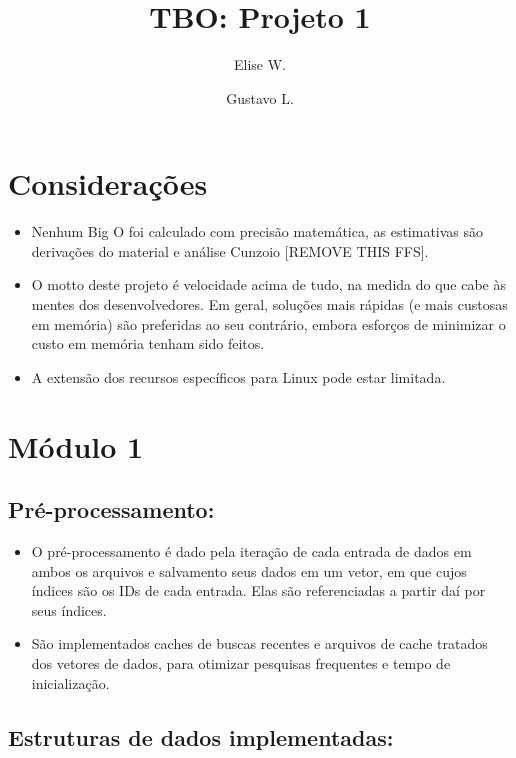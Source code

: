 \documentclass{article}
\author{Elise W.\and Gustavo L.}
\date{}
\title{TBO: Projeto 1}
\begin{document}
\maketitle

\section*{Considerações}

	\begin{itemize}

		\item Nenhum Big O foi calculado com precisão matemática, as estimativas são derivações do material e análise Cunzoio [REMOVE THIS FFS].

		\item O motto deste projeto é velocidade acima de tudo, na medida do que cabe às mentes dos desenvolvedores. Em geral, soluções mais rápidas (e mais custosas em memória) são preferidas ao seu contrário, 
embora esforços de minimizar o custo em memória tenham sido feitos.

		\item A extensão dos recursos específicos para Linux pode estar limitada.

	\end{itemize}

\section{Módulo 1}

\subsection{Pré-processamento: }

	\begin{itemize}
	
		\item O pré-processamento é dado pela iteração de cada entrada de dados em ambos os arquivos e salvamento seus dados em um vetor, em que cujos índices são os IDs de cada entrada. Elas são referenciadas a partir daí por seus índices.

		\item [A FAZER] São implementados caches de buscas recentes e arquivos de cache tratados dos vetores de dados, para otimizar pesquisas frequentes e tempo de inicialização.

	\end{itemize}
\subsection{Estruturas de dados implementadas: }
\end{document}
